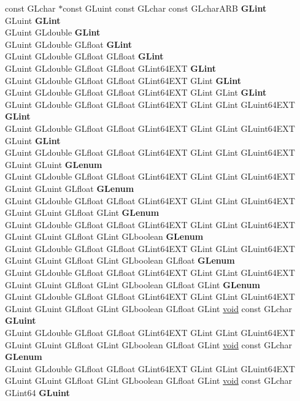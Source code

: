 \begin{DoxyCompactItemize}
\begin{tabbing}
\>const GLchar $\ast$const GLuint const GLchar const GLcharARB {\bfseries GLint}\\
\>GLuint {\bfseries GLint}\\
\>GLuint GLdouble {\bfseries GLint}\\
\>GLuint GLdouble GLfloat {\bfseries GLint}\\
\>GLuint GLdouble GLfloat GLfloat {\bfseries GLint}\\
\>GLuint GLdouble GLfloat GLfloat GLint64EXT {\bfseries GLint}\\
\>GLuint GLdouble GLfloat GLfloat GLint64EXT GLint {\bfseries GLint}\\
\>GLuint GLdouble GLfloat GLfloat GLint64EXT GLint GLint {\bfseries GLint}\\
\>GLuint GLdouble GLfloat GLfloat GLint64EXT GLint GLint GLuint64EXT {\bfseries GLint}\\
\>GLuint GLdouble GLfloat GLfloat GLint64EXT GLint GLint GLuint64EXT GLuint {\bfseries GLint}\\
\>GLuint GLdouble GLfloat GLfloat GLint64EXT GLint GLint GLuint64EXT GLuint GLuint {\bfseries GLenum}\\
\>GLuint GLdouble GLfloat GLfloat GLint64EXT GLint GLint GLuint64EXT GLuint GLuint GLfloat {\bfseries GLenum}\\
\>GLuint GLdouble GLfloat GLfloat GLint64EXT GLint GLint GLuint64EXT GLuint GLuint GLfloat GLint {\bfseries GLenum}\\
\>GLuint GLdouble GLfloat GLfloat GLint64EXT GLint GLint GLuint64EXT GLuint GLuint GLfloat GLint GLboolean {\bfseries GLenum}\\
\>GLuint GLdouble GLfloat GLfloat GLint64EXT GLint GLint GLuint64EXT GLuint GLuint GLfloat GLint GLboolean GLfloat {\bfseries GLenum}\\
\>GLuint GLdouble GLfloat GLfloat GLint64EXT GLint GLint GLuint64EXT GLuint GLuint GLfloat GLint GLboolean GLfloat GLint {\bfseries GLenum}\\
\>GLuint GLdouble GLfloat GLfloat GLint64EXT GLint GLint GLuint64EXT GLuint GLuint GLfloat GLint GLboolean GLfloat GLint \hyperlink{interfacevoid}{void} const GLchar {\bfseries GLuint}\\
\>GLuint GLdouble GLfloat GLfloat GLint64EXT GLint GLint GLuint64EXT GLuint GLuint GLfloat GLint GLboolean GLfloat GLint \hyperlink{interfacevoid}{void} const GLchar {\bfseries GLenum}\\
\>GLuint GLdouble GLfloat GLfloat GLint64EXT GLint GLint GLuint64EXT GLuint GLuint GLfloat GLint GLboolean GLfloat GLint \hyperlink{interfacevoid}{void} const GLchar GLint64 {\bfseries GLuint}\\

\end{tabbing}
\end{DoxyCompactItemize}
